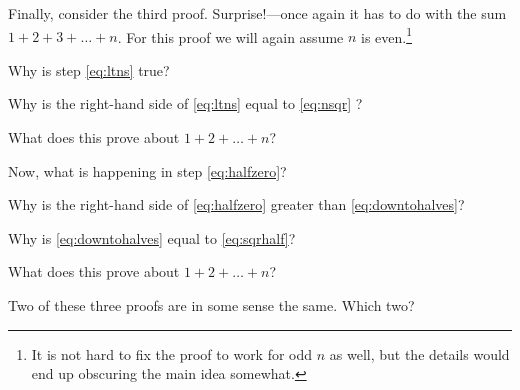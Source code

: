 \documentclass{tufte-handout}
\begin{document}
Finally, consider the third proof.  Surprise!---once again it has to
do with the sum $1 + 2 + 3 + \dots + n$.  For this proof we will
again assume $n$ is even.\footnote{It is not hard to fix the proof to work
  for odd $n$ as well, but the details would end up obscuring the main
  idea somewhat.}
\begin{questions}
  \item Why is step \eqref{eq:ltns} true?
  \item Why is the right-hand side of \eqref{eq:ltns} equal to
    \eqref{eq:nsqr} ?
  \item What does this prove about $1 + 2 + \dots + n$?
  \item Now, what is happening in step \eqref{eq:halfzero}?
  \item Why is the right-hand side of \eqref{eq:halfzero} greater than
    \eqref{eq:downtohalves}?
  \item Why is \eqref{eq:downtohalves} equal to \eqref{eq:sqrhalf}?
  \item What does this prove about $1 + 2 + \dots + n$?
  \item Two of these three proofs are in some sense the same.  Which two?
  \end{questions}
\end{document}
